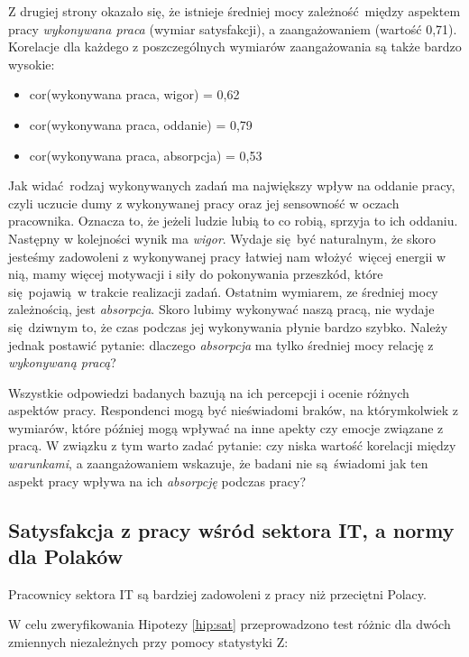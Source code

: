 Z drugiej strony okazało się, że istnieje średniej mocy zależność między aspektem pracy \textit{wykonywana praca} (wymiar satysfakcji), a zaangażowaniem (wartość 0,71). Korelacje dla każdego z poszczególnych wymiarów zaangażowania są także bardzo wysokie:
\begin{itemize}
  \item cor(wykonywana praca, wigor) = 0,62
  \item cor(wykonywana praca, oddanie) = 0,79
  \item cor(wykonywana praca, absorpcja) = 0,53
\end{itemize}
Jak widać rodzaj wykonywanych zadań ma największy wpływ na oddanie pracy, czyli uczucie dumy z wykonywanej pracy oraz jej sensowność w oczach pracownika. Oznacza to, że jeżeli ludzie lubią to co robią, sprzyja to ich oddaniu. Następny w kolejności wynik ma \textit{wigor}. Wydaje się być naturalnym, że skoro jesteśmy zadowoleni z wykonywanej pracy łatwiej nam włożyć więcej energii w nią, mamy więcej motywacji i siły do pokonywania przeszkód, które się pojawią w trakcie
realizacji zadań. Ostatnim wymiarem, ze średniej mocy zależnością, jest \textit{absorpcja}. Skoro lubimy wykonywać naszą pracą, nie wydaje się dziwnym to, że czas podczas jej wykonywania płynie bardzo szybko. Należy jednak postawić pytanie: dlaczego \textit{absorpcja} ma tylko średniej mocy relację z \textit{wykonywaną pracą}? 

Wszystkie odpowiedzi badanych bazują na ich percepcji i ocenie różnych aspektów pracy. Respondenci mogą być nieświadomi braków, na którymkolwiek z wymiarów, które później mogą wpływać na inne apekty czy emocje związane z pracą. W związku z tym warto zadać pytanie: czy niska wartość korelacji między \textit{warunkami}, a zaangażowaniem wskazuje, że badani nie są świadomi jak ten aspekt pracy wpływa na ich \textit{absorpcję} podczas pracy? 

\subsection{Satysfakcja z pracy wśród sektora IT, a normy dla Polaków}

\begin{hyp}
  Pracownicy sektora IT są bardziej zadowoleni z pracy niż przeciętni Polacy.
  \label{hip:sat}
\end{hyp}

W celu zweryfikowania Hipotezy \ref{hip:sat} przeprowadzono test różnic dla dwóch zmiennych niezależnych przy pomocy statystyki Z:

